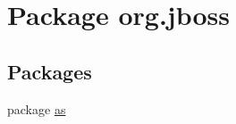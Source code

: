 \hypertarget{namespaceorg_1_1jboss}{}\section{Package org.\+jboss}
\label{namespaceorg_1_1jboss}
\subsection*{Packages}
\begin{DoxyCompactItemize}
\item 
package \hyperlink{namespaceorg_1_1jboss_1_1as}{as}
\end{DoxyCompactItemize}
